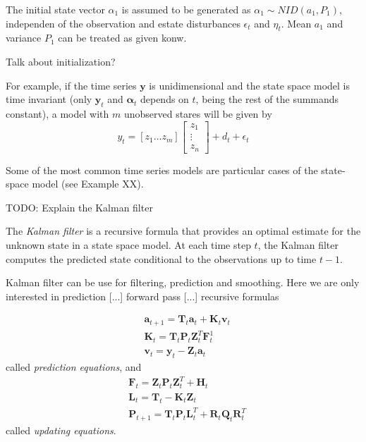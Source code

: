 {\color{red} The initial state vector $\alpha_1$ is assumed to be generated as $\alpha_1 \sim NID \left( a_1, P_1 \right)$, independen of the observation and estate disturbances $\epsilon_t$ and $\eta_t$. Mean $a_1$ and variance $P_1$ can be treated as given konw.}

{\color{red} Talk about initialization?}

For example, if the time series $\mathbf{y}$ is unidimensional and the state space model is time invariant (only $\mathbf{y}_t$ and $\mathbf{\alpha}_t$ depends on $t$, being the rest of the summands constant), a model with $m$ unobserved stares will be given by
\[
y_t = [ z_1 \ldots z_m ]
\begin{bmatrix}
  z_{1} \\
  \vdots \\
  z_{n}
\end{bmatrix}
+ d_{t} + \epsilon_{t}
\]

Some of the most common time series models are particular cases of the state-space model (see Example XX).

\begin{example}
\end{example}

{\color{red} TODO: Explain the Kalman filter}

The \emph{Kalman filter} is a recursive formula that provides an optimal estimate for the unknown state in a state space model. At each time step $t$, the Kalman filter computes the predicted state conditional to the observations up to time $t-1$.

{\color{red} Kalman filter can be use for filtering, prediction and smoothing. Here we are only interested in prediction [...] forward pass [...] recursive formulas}

\begin{definition}
\begin{equation}
\begin{split}
  & \mathbf{a}_{t+1} = \mathbf{T}_t \mathbf{a}_t + \mathbf{K}_t \mathbf{v}_t  \\
  & \mathbf{K}_t = \mathbf{T}_t \mathbf{P}_t \mathbf{Z}_t^T \mathbf{F}_t^{1} \\
  & \mathbf{v}_t = \mathbf{y}_t  - \mathbf{Z}_t \mathbf{a}_t
\end{split}
\end{equation}
called \emph{prediction equations}, and
\begin{equation}
\begin{split}
  & \mathbf{F}_t = \mathbf{Z}_t \mathbf{P}_t \mathbf{Z}_t^T + \mathbf{H}_t \\
  & \mathbf{L}_t = \mathbf{T}_t - \mathbf{K}_t \mathbf{Z}_t \\
  & \mathbf{P}_{t+1} = \mathbf{T}_t \mathbf{P}_t \mathbf{L}_t^T + \mathbf{R}_t \mathbf{Q}_t \mathbf{R}_t^T
\end{split}
\end{equation}
called \emph{updating equations}.
\end{definition}

